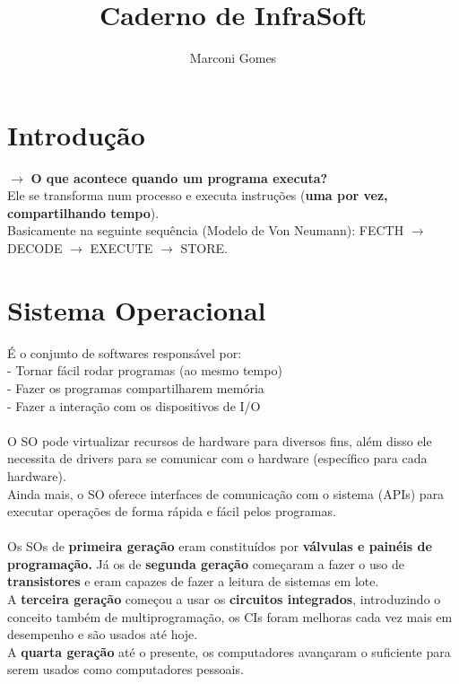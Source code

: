 \documentclass[12pt]{article}
\begin{document}
\nocite{*}

\title{Caderno de InfraSoft}
\author{Marconi Gomes}

\maketitle


\section{Introdução}
    $\rightarrow$ \textbf{O que acontece quando um programa executa?} 
    \\ Ele se transforma num processo e executa instruções (\textbf{uma por vez, compartilhando tempo}). 
    \\Basicamente na seguinte sequência (Modelo de Von Neumann): FECTH $\rightarrow$ DECODE $\rightarrow$ EXECUTE $\rightarrow$ STORE.
    
\section{Sistema Operacional}
É o conjunto de softwares responsável por: 
\\  - Tornar fácil rodar programas (ao mesmo tempo)
\\  - Fazer os programas compartilharem memória
\\  - Fazer a interação com os dispositivos de I/O
\\~\\O SO pode virtualizar recursos de hardware para diversos fins, além disso ele necessita de drivers para se comunicar com o hardware (específico para cada hardware).
\\Ainda mais, o SO oferece interfaces de comunicação com o sistema (APIs) para executar operações de forma rápida e fácil pelos programas.
\\~\\Os SOs de \textbf{primeira geração} eram constituídos por \textbf{válvulas e painéis de programação.} Já os de \textbf{segunda geração} começaram a fazer o uso de \textbf{transistores} e eram capazes de fazer a leitura de sistemas em lote.
\\A \textbf{terceira geração} começou a usar os \textbf{circuitos integrados}, introduzindo o conceito também de multiprogramação, os CIs foram melhoras cada vez mais em desempenho e são usados até hoje.
\\A \textbf{quarta geração} até o presente, os computadores avançaram o suficiente para serem usados como computadores pessoais.
\end{document}
